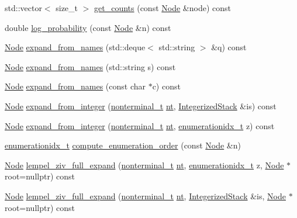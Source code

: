 \begin{DoxyCompactItemize}
\item 
std\+::vector$<$ size\+\_\+t $>$ \hyperlink{class_grammar_ae0823f7af30a851a968dae46adbd49a5}{get\+\_\+counts} (const \hyperlink{class_node}{Node} \&node) const
\item 
double \hyperlink{class_grammar_a11f1788026f68e7ddb7fca1ec04915f5}{log\+\_\+probability} (const \hyperlink{class_node}{Node} \&n) const
\item 
\hyperlink{class_node}{Node} \hyperlink{class_grammar_ab5bd3d35545bcab4dbd3ca1d136bd4ce}{expand\+\_\+from\+\_\+names} (std\+::deque$<$ std\+::string $>$ \&q) const
\item 
\hyperlink{class_node}{Node} \hyperlink{class_grammar_a44954a36c11d58c23bef02ca7d541005}{expand\+\_\+from\+\_\+names} (std\+::string s) const
\item 
\hyperlink{class_node}{Node} \hyperlink{class_grammar_a0addff494602ebb19852c2d4314eaac6}{expand\+\_\+from\+\_\+names} (const char $\ast$c) const
\item 
\hyperlink{class_node}{Node} \hyperlink{class_grammar_a221f1a43488624ce78138d7d5045a816}{expand\+\_\+from\+\_\+integer} (\hyperlink{_nonterminal_8h_a5c1f658dc7560600a16d22408bd716ca}{nonterminal\+\_\+t} \hyperlink{class_grammar_aa5c9afa0e7e1aa989b54402b02a677a3}{nt}, \hyperlink{class_integerized_stack}{Integerized\+Stack} \&is) const
\item 
\hyperlink{class_node}{Node} \hyperlink{class_grammar_a7b478d4ad5955b7489074e106afce5a4}{expand\+\_\+from\+\_\+integer} (\hyperlink{_nonterminal_8h_a5c1f658dc7560600a16d22408bd716ca}{nonterminal\+\_\+t} \hyperlink{class_grammar_aa5c9afa0e7e1aa989b54402b02a677a3}{nt}, \hyperlink{_numerics_8h_a9fe2bbca873b046b2bd276fc6856bb88}{enumerationidx\+\_\+t} z) const
\item 
\hyperlink{_numerics_8h_a9fe2bbca873b046b2bd276fc6856bb88}{enumerationidx\+\_\+t} \hyperlink{class_grammar_ab6970c88fc6f5ed56020fe0dfac302f4}{compute\+\_\+enumeration\+\_\+order} (const \hyperlink{class_node}{Node} \&n)
\item 
\hyperlink{class_node}{Node} \hyperlink{class_grammar_a607aa205d57a1b61b07f9ef57adcf697}{lempel\+\_\+ziv\+\_\+full\+\_\+expand} (\hyperlink{_nonterminal_8h_a5c1f658dc7560600a16d22408bd716ca}{nonterminal\+\_\+t} \hyperlink{class_grammar_aa5c9afa0e7e1aa989b54402b02a677a3}{nt}, \hyperlink{_numerics_8h_a9fe2bbca873b046b2bd276fc6856bb88}{enumerationidx\+\_\+t} z, \hyperlink{class_node}{Node} $\ast$root=nullptr) const
\item 
\hyperlink{class_node}{Node} \hyperlink{class_grammar_a98fd19c7b9c1d92c59365a693ec12547}{lempel\+\_\+ziv\+\_\+full\+\_\+expand} (\hyperlink{_nonterminal_8h_a5c1f658dc7560600a16d22408bd716ca}{nonterminal\+\_\+t} \hyperlink{class_grammar_aa5c9afa0e7e1aa989b54402b02a677a3}{nt}, \hyperlink{class_integerized_stack}{Integerized\+Stack} \&is, \hyperlink{class_node}{Node} $\ast$root=nullptr) const

\end{DoxyCompactItemize}

